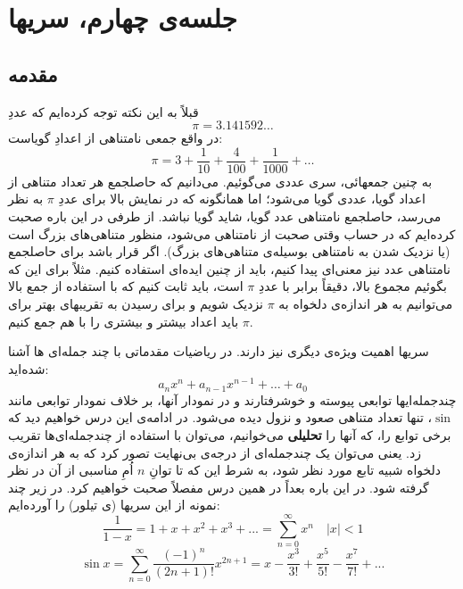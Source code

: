\documentclass[12pt,a4paper]{article}
\theoremstyle{definition}
\begin{document}
\section{جلسه‌ی چهارم، سریها}
\subsection*{مقدمه}
قبلاً  به این نکته توجه کرده‌ایم که عددِ
\[
\pi=3.141592\ldots
\]
در واقع جمعی نامتناهی از اعدادِ گویاست:
\[
\pi=3+\frac{1}{10}+\frac{4}{100}+\frac{1}{1000}+\ldots
\]
به چنین جمعهائی، سری عددی می‌گوئیم.  می‌دانیم که حاصلجمع هر تعداد متناهی از اعداد گویا، عددی گویا می‌شود؛ اما همانگونه که در نمایش بالا برای عددِ
$\pi$
به نظر می‌رسد، حاصلجمع نامتناهی عدد گویا، شاید گویا نباشد.
از طرفی در این باره صحبت کرده‌ایم که 
در حساب وقتی صحبت از نامتناهی می‌شود، منظور متناهی‌های بزرگ است (یا نزدیک شدن به نامتناهی بوسیله‌ی متناهی‌های بزرگ). 
اگر قرار باشد برای حاصلجمع نامتناهی عدد نیز معنی‌ای پیدا کنیم، باید از چنین ایده‌ای استفاده کنیم. مثلاً برای این که بگوئیم
مجموع بالا، دقیقاً برابر با عددِ
$\pi$
است، باید ثابت کنیم که با استفاده از جمع بالا می‌توانیم به هر اندازه‌ی دلخواه به 
$\pi$
نزدیک شویم و برای رسیدن به تقریبهای بهتر برای
$\pi$
باید اعداد بیشتر و بیشتری را با هم جمع کنیم.
\par 
سریها اهمیت ویژه‌ی دیگری نیز دارند. در ریاضیات مقدماتی با چند جمله‌ای ها آشنا شده‌اید:
\[
a_nx^n+a_{n-1}x^{n-1}+\ldots +a_0
\]
چندجمله‌ایها توابعی پیوسته و خوشرفتارند و در نمودار آنها، بر خلاف نمودار توابعی مانند
$\sin$،
 تنها تعداد متناهی صعود و نزول دیده می‌شود. 
 در ادامه‌ی این درس خواهیم دید که برخی توابع را، که آنها را \textbf{تحلیلی} می‌خوانیم، می‌توان با استفاده از چندجمله‌ای‌ها تقریب زد. یعنی می‌توان یک چندجمله‌ای از درجه‌ی بی‌نهایت تصور کرد که به هر اندازه‌ی دلخواه شبیه تابع مورد نظر شود، به شرط این که تا توانِ
 $n$
 اُمِ مناسبی از آن در نظر گرفته شود. در این باره بعداً در همین درس مفصلاً صحبت خواهیم کرد. در زیر چند نمونه‌ از این سریها (ی تیلور) را آورده‌ایم:
\[
\frac{1}{1-x}=1+x+x^2+x^3+...=\sum_{n=0}^{\infty}x^n \quad |x|<1
\]
\[
\sin x = \sum_{n=0}^{\infty}\frac{(-1)^{n}}{(2n+1)!}x^{2n+1}=x-\frac{x^3}{3!}+\frac{x^5}{5!}-\frac{x^7}{7!}+...
\]
\end{document}
